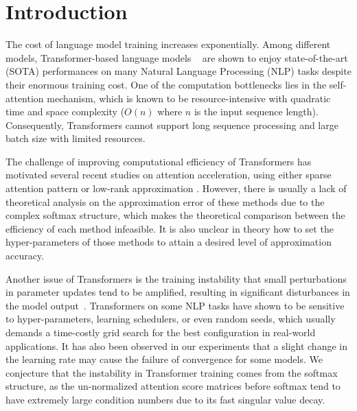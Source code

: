 \section{Introduction}
\label{sec:intro}


The cost of language model training increases exponentially.
Among different models, Transformer-based language models ~\citep{DBLP:conf/nips/VaswaniSPUJGKP17, DBLP:journals/corr/abs-1810-04805, DBLP:journals/corr/abs-1907-11692, DBLP:conf/acl/LewisLGGMLSZ20} are shown to enjoy state-of-the-art (SOTA) performances on many Natural Language Processing (NLP) tasks despite their enormous training cost. %
One of the computation bottlenecks lies in the self-attention mechanism, which is known to be resource-intensive with quadratic time and space complexity ($O(n)$ where $n$ is the input sequence length).
Consequently, Transformers cannot support long sequence processing and large batch size with limited resources.

The challenge of improving computational efficiency of Transformers has motivated several recent studies on attention acceleration, using either sparse attention pattern \citep{DBLP:conf/emnlp/QiuMLYW020, DBLP:journals/corr/abs-1904-10509, DBLP:conf/nips/ZaheerGDAAOPRWY20, DBLP:journals/corr/abs-2004-05150, DBLP:conf/iclr/KitaevKL20} or low-rank approximation \citep{DBLP:journals/corr/abs-2009-14794, DBLP:journals/corr/abs-2006-04768}. 
However, there is usually a lack of theoretical analysis on the approximation error of these methods due to the complex softmax structure, which makes the theoretical comparison between the efficiency of each method infeasible.
It is also unclear in theory how to set the hyper-parameters of those methods to attain a desired level of approximation accuracy.


Another issue of Transformers is the training instability that small perturbations in parameter updates tend to be amplified, resulting in significant disturbances in the model output~\citep{DBLP:conf/emnlp/LiuLGCH20}.
Transformers on some NLP tasks have shown to be sensitive to hyper-parameters, learning schedulers, or even random seeds, which usually demands a time-costly grid search for the best configuration in real-world applications.
It has also been observed in our experiments that a slight change in the learning rate may cause the failure of convergence for some models.
We conjecture that the instability in Transformer training comes from the softmax structure,
as the un-normalized attention score matrices before softmax tend to have extremely large condition numbers due to its fast singular value decay.


